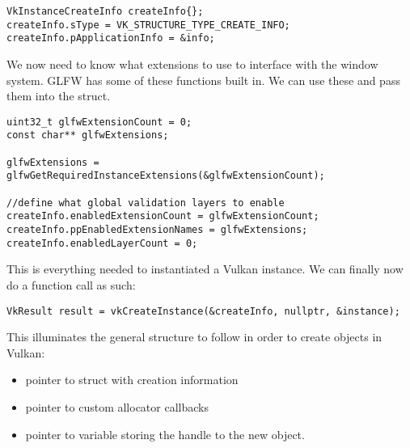 \begin{center}
\begin{minipage}{0.95\linewidth}
\begin{lstlisting}
VkInstanceCreateInfo createInfo{};
createInfo.sType = VK_STRUCTURE_TYPE_CREATE_INFO;
createInfo.pApplicationInfo = &info;
\end{lstlisting}
\end{minipage}
\end{center}

\par We now need to know what extensions to use to interface with the window system. GLFW has some of these functions built in. We can use these and pass them into the struct.

\begin{center}
\begin{minipage}{0.95\linewidth}
\begin{lstlisting}
uint32_t glfwExtensionCount = 0;
const char** glfwExtensions;

glfwExtensions = glfwGetRequiredInstanceExtensions(&glfwExtensionCount);

//define what global validation layers to enable
createInfo.enabledExtensionCount = glfwExtensionCount;
createInfo.ppEnabledExtensionNames = glfwExtensions;
createInfo.enabledLayerCount = 0;
\end{lstlisting}   
\end{minipage}
\end{center}

\par This is everything needed to instantiated a Vulkan instance. We can finally now do a  function call as such: 

\begin{center}
\begin{minipage}{0.95\linewidth}
\begin{lstlisting}
VkResult result = vkCreateInstance(&createInfo, nullptr, &instance);
\end{lstlisting}
\end{minipage}
\end{center}

\par This illuminates the general structure to follow in order to create objects in Vulkan:
\begin{itemize}
    \item pointer to struct with creation information
    \item pointer to custom allocator callbacks
    \item pointer to variable storing the handle to the new object.
\end{itemize}

